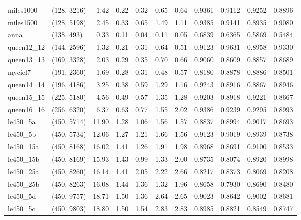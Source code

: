 \begin{tabular}{llrrrrrrrrr}
 miles1000 &  (128, 3216) &  1.42 & 0.22 & 0.32 &  0.65 &   0.64 &   0.9361 &   0.9112 &     0.9252 &      0.8896 \\
 miles1500 &  (128, 5198) &  2.45 & 0.33 & 0.65 &  1.49 &   1.11 &   0.9385 &   0.9141 &     0.8935 &      0.9080 \\
      anna &   (138, 493) &  0.33 & 0.11 & 0.04 &  0.11 &   0.05 &   0.6839 &   0.6365 &     0.5869 &      0.5484 \\
queen12\_12 &  (144, 2596) &  1.32 & 0.21 & 0.31 &  0.64 &   0.51 &   0.9123 &   0.9631 &     0.8958 &      0.9330 \\
queen13\_13 &  (169, 3328) &  2.03 & 0.29 & 0.35 &  0.70 &   0.66 &   0.9060 &   0.8609 &     0.8857 &      0.8689 \\
   myciel7 &  (191, 2360) &  1.69 & 0.28 & 0.31 &  0.48 &   0.57 &   0.8180 &   0.8878 &     0.8886 &      0.8501 \\
queen14\_14 &  (196, 4186) &  3.25 & 0.38 & 0.59 &  1.29 &   1.16 &   0.9243 &   0.8916 &     0.8867 &      0.8946 \\
queen15\_15 &  (225, 5180) &  4.56 & 0.49 & 0.57 &  1.35 &   1.28 &   0.9203 &   0.8918 &     0.9221 &      0.8667 \\
queen16\_16 &  (256, 6320) &  6.37 & 0.63 & 0.77 &  1.55 &   2.02 &   0.9386 &   0.9239 &     0.9295 &      0.8993 \\
  le450\_5a &  (450, 5714) & 11.90 & 1.28 & 1.06 &  1.56 &   1.57 &   0.8837 &   0.8994 &     0.9017 &      0.8693 \\
  le450\_5b &  (450, 5734) & 12.06 & 1.27 & 1.21 &  1.66 &   1.56 &   0.9123 &   0.9019 &     0.8939 &      0.8738 \\
 le450\_15a &  (450, 8168) & 16.02 & 1.41 & 1.26 &  1.91 &   1.98 &   0.8968 &   0.8691 &     0.9100 &      0.8533 \\
 le450\_15b &  (450, 8169) & 15.93 & 1.43 & 0.99 &  1.33 &   2.00 &   0.8735 &   0.8074 &     0.8920 &      0.8998 \\
 le450\_25a &  (450, 8260) & 16.14 & 1.41 & 2.05 &  2.22 &   2.66 &   0.8217 &   0.8373 &     0.8069 &      0.8208 \\
 le450\_25b &  (450, 8263) & 16.08 & 1.44 & 1.36 &  1.32 &   1.96 &   0.8658 &   0.7930 &     0.8690 &      0.8480 \\
  le450\_5d &  (450, 9757) & 18.71 & 1.50 & 1.36 &  2.64 &   2.65 &   0.9023 &   0.8642 &     0.9002 &      0.8681 \\
  le450\_5c &  (450, 9803) & 18.80 & 1.50 & 1.54 &  2.83 &   2.83 &   0.8985 &   0.8821 &     0.8549 &      0.8747 \\

\end{tabular}
